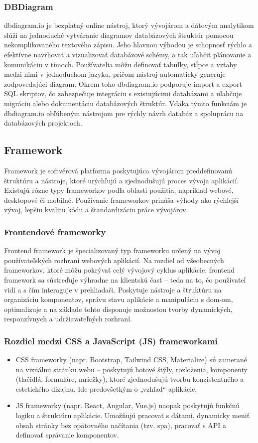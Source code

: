  \subsubsection{DBDiagram}
 dbdiagram.io je bezplatný online nástroj, ktorý vývojárom a dátovým analytikom slúži na jednoduché vytváranie diagramov databázových štruktúr pomocou nekomplikovaného textového zápisu.
 Jeho hlavnou výhodou je schopnosť rýchlo a efektívne navrhovať a vizualizovať databázové schémy, a tak uľahčiť plánovanie a komunikáciu v tímoch.
 Používatelia môžu definovať tabuľky, stĺpce a vzťahy medzi nimi v jednoduchom jazyku, pričom nástroj automaticky generuje zodpovedajúci diagram.
 Okrem toho dbdiagram.io podporuje import a export SQL skriptov, čo zabezpečuje integráciu s existujúcimi databázami a uľahčuje migráciu alebo dokumentáciu databázových štruktúr.
 Vďaka týmto funkciám je dbdiagram.io obľúbeným nástrojom pre rýchly návrh databáz a spoluprácu na databázových projektoch.
 \subsection{Framework}
 Framework je softvérová platforma poskytujúca vývojárom preddefinovanú štruktúru a nástroje, ktoré urýchľujú a zjednodušujú proces vývoja aplikácií.
 Existujú rôzne typy frameworkov podľa oblasti použitia, napríklad webové, desktopové či mobilné.
 Používanie frameworkov prináša výhody ako rýchlejší vývoj, lepšiu kvalitu kódu a štandardizáciu práce vývojárov. \cite{framework}
 \subsubsection{Frontendové frameworky}
 Frontend framework je špecializovaný typ frameworku určený na vývoj používateľských rozhraní webových aplikácií.
 Na rozdiel od všeobecných frameworkov, ktoré môžu pokrývať celý vývojový cyklus aplikácie, frontend framework sa sústreďuje výhradne na klientskú časť – teda na to, čo používateľ vidí a s čím interaguje v prehliadači.
 Poskytuje nástroje a štruktúru na organizáciu komponentov, správu stavu aplikácie a manipuláciu s \acrshort{dom}-om, optimalizuje a na základe tohto disponuje možnosťou tvorby dynamických, responzívnych a udržiavateľných rozhraní.
 \subsubsection{Rozdiel medzi CSS a JavaScript (JS) frameworkami}
 \begin{itemize}
  \item CSS frameworky (napr. Bootstrap, Tailwind CSS, Materialize) sú zamerané na vizuálnu stránku webu – poskytujú hotové štýly, rozloženia, komponenty (tlačidlá, formuláre, mriežky), ktoré zjednodušujú tvorbu konzistentného a estetického dizajnu. Ide predovšetkým o „vzhľad“ aplikácie.
  \item JS frameworky (napr. React, Angular, Vue.js) naopak poskytujú funkčnú logiku a štruktúru aplikácie. 
  Umožňujú pracovať s dátami, dynamicky meniť obsah stránky bez opätovného načítania (tzv. \acrshort{spa}), pracovať s API a definovať správanie komponentov.\cite{feframework}
\end{itemize}

